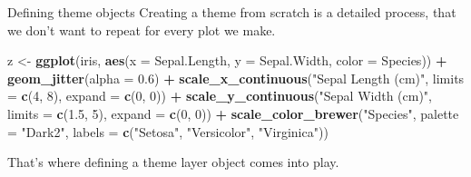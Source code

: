 \documentclass[
  ignorenonframetext,
]{beamer}
\newenvironment{Shaded}{\begin{snugshade}}{\end{snugshade}}
\newcommand{\AttributeTok}[1]{\textcolor[rgb]{0.13,0.29,0.53}{#1}}
\newcommand{\DecValTok}[1]{\textcolor[rgb]{0.00,0.00,0.81}{#1}}
\newcommand{\FloatTok}[1]{\textcolor[rgb]{0.00,0.00,0.81}{#1}}
\newcommand{\FunctionTok}[1]{\textcolor[rgb]{0.13,0.29,0.53}{\textbf{#1}}}
\newcommand{\NormalTok}[1]{#1}
\newcommand{\OtherTok}[1]{\textcolor[rgb]{0.56,0.35,0.01}{#1}}
\newcommand{\SpecialCharTok}[1]{\textcolor[rgb]{0.81,0.36,0.00}{\textbf{#1}}}
\newcommand{\StringTok}[1]{\textcolor[rgb]{0.31,0.60,0.02}{#1}}
\begin{document}
\begin{frame}[fragile]{Defining theme objects}
\label{defining-theme-objects-1}
Creating a theme from scratch is a detailed process, that we don't want
to repeat for every plot we make.


\begin{Shaded}
\begin{Highlighting}[]
\NormalTok{z }\OtherTok{\textless{}{-}} \FunctionTok{ggplot}\NormalTok{(iris, }\FunctionTok{aes}\NormalTok{(}\AttributeTok{x =}\NormalTok{ Sepal.Length, }\AttributeTok{y =}\NormalTok{ Sepal.Width, }\AttributeTok{color =}\NormalTok{ Species)) }\SpecialCharTok{+}
    \FunctionTok{geom\_jitter}\NormalTok{(}\AttributeTok{alpha =} \FloatTok{0.6}\NormalTok{) }\SpecialCharTok{+} \FunctionTok{scale\_x\_continuous}\NormalTok{(}\StringTok{"Sepal Length (cm)"}\NormalTok{,}
    \AttributeTok{limits =} \FunctionTok{c}\NormalTok{(}\DecValTok{4}\NormalTok{, }\DecValTok{8}\NormalTok{), }\AttributeTok{expand =} \FunctionTok{c}\NormalTok{(}\DecValTok{0}\NormalTok{, }\DecValTok{0}\NormalTok{)) }\SpecialCharTok{+} \FunctionTok{scale\_y\_continuous}\NormalTok{(}\StringTok{"Sepal Width (cm)"}\NormalTok{,}
    \AttributeTok{limits =} \FunctionTok{c}\NormalTok{(}\FloatTok{1.5}\NormalTok{, }\DecValTok{5}\NormalTok{), }\AttributeTok{expand =} \FunctionTok{c}\NormalTok{(}\DecValTok{0}\NormalTok{, }\DecValTok{0}\NormalTok{)) }\SpecialCharTok{+} \FunctionTok{scale\_color\_brewer}\NormalTok{(}\StringTok{"Species"}\NormalTok{,}
    \AttributeTok{palette =} \StringTok{"Dark2"}\NormalTok{, }\AttributeTok{labels =} \FunctionTok{c}\NormalTok{(}\StringTok{"Setosa"}\NormalTok{, }\StringTok{"Versicolor"}\NormalTok{, }\StringTok{"Virginica"}\NormalTok{))}
\end{Highlighting}
\end{Shaded}

That's where defining a theme layer object comes into play.
\end{frame}
\end{document}
